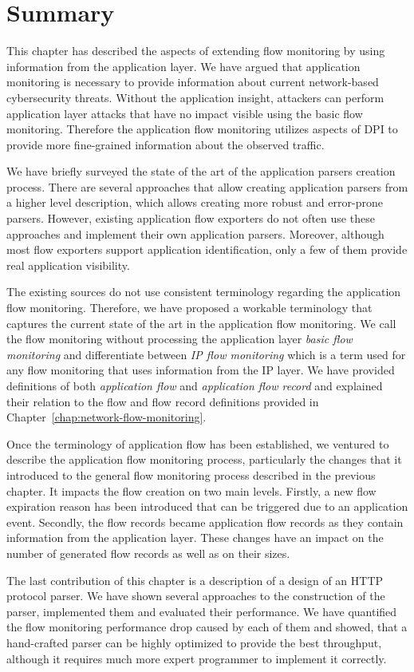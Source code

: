 \section{Summary}\label{sec:app-summary}

This chapter has described the aspects of extending flow monitoring by using information from the application layer. We have argued that application monitoring is necessary to provide information about current network-based cybersecurity threats. Without the application insight, attackers can perform application layer attacks that have no impact visible using the basic flow monitoring. Therefore the application flow monitoring utilizes aspects of DPI to provide more fine-grained information about the observed traffic. 

We have briefly surveyed the state of the art of the application parsers creation process. There are several approaches that allow creating application parsers from a higher level description, which allows creating more robust and error-prone parsers. However, existing application flow exporters do not often use these approaches and implement their own application parsers. Moreover, although most flow exporters support application identification, only a few of them provide real application visibility. 

The existing sources do not use consistent terminology regarding the application flow monitoring. Therefore, we have proposed a workable terminology that captures the current state of the art in the application flow monitoring. We call the flow monitoring without processing the application layer \emph{basic flow monitoring} and differentiate between \emph{IP flow monitoring} which is a term used for any flow monitoring that uses information from the IP layer. We have provided definitions of both \emph{application flow} and \emph{application flow record} and explained their relation to the flow and flow record definitions provided in Chapter~\ref{chap:network-flow-monitoring}.

Once the terminology of application flow has been established, we ventured to describe the application flow monitoring process, particularly the changes that it introduced to the general flow monitoring process described in the previous chapter. It impacts the flow creation on two main levels. Firstly, a new flow expiration reason has been introduced that can be triggered due to an application event. Secondly, the flow records became application flow records as they contain information from the application layer. These changes have an impact on the number of generated flow records as well as on their sizes.

The last contribution of this chapter is a description of a design of an HTTP protocol parser. We have shown several approaches to the construction of the parser, implemented them and evaluated their performance. We have quantified the flow monitoring performance drop caused by each of them and showed, that a hand-crafted parser can be highly optimized to provide the best throughput, although it requires much more expert programmer to implement it correctly.

